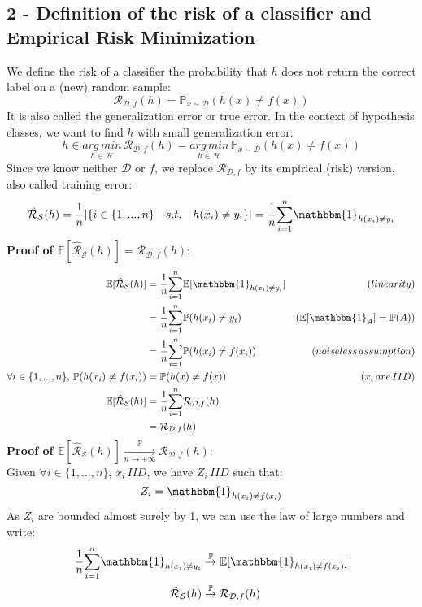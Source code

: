 \documentclass{homework}
\begin{document}
\subsection*{2 - Definition of the risk of a classifier and Empirical Risk Minimization}
We define the risk of a classifier the probability that $h$ does not return the correct label on a (new) random sample:
$$\mathcal{R}_{\mathcal{D},f}(h)=\mathbb{P}_{x\sim\mathcal{D}}(h(x)\neq f(x))$$
It is also called the generalization error or true error. In the context of hypothesis classes, we want to find $h$ with small generalization error:
$$h\in\underset{h\in\mathcal{H}}{arg\,min}\,\mathcal{R}_{\mathcal{D},f}(h)=\underset{h\in\mathcal{H}}{arg\,min}\,\mathbb{P}_{x\sim\mathcal{D}}(h(x)\neq f(x))$$
Since we know neither $\mathcal{D}$ or $f$, we replace $\mathcal{R}_{\mathcal{D},f}$ by its empirical (risk) version, also called training error:
$$\hat{\mathcal{R}}_{\mathcal{S}}(h)=\frac{1}{n}|\{i\in\{1,...,n\}\quad{s.t.}\quad h(x_i)\neq y_i\}|=\frac{1}{n}\underset{i=1}{\overset{n}{\sum}}\mathbbm{1}_{h(x_i)\neq y_i}$$
\textbf{Proof of $\mathbb{E}[\hat{\mathcal{R}}_{\mathcal{S}}(h)]=\mathcal{R}_{\mathcal{D},f}(h)$}:
\begin{align*}
   \mathbb{E}[\hat{\mathcal{R}}_{\mathcal{S}}(h)]&=\frac{1}{n}\underset{i=1}{\overset{n}{\sum}}\mathbb{E}[\mathbbm{1}_{h(x_i)\neq y_i}] &(linearity)\\
   &=\frac{1}{n}\underset{i=1}{\overset{n}{\sum}}\mathbb{P}(h(x_i)\neq y_i)&(\mathbb{E}[\mathbbm{1}_A]=\mathbb{P}(A))\\
   &=\frac{1}{n}\underset{i=1}{\overset{n}{\sum}}\mathbb{P}(h(x_i)\neq f(x_i))&(noiseless\, assumption)\\
   \forall i \in \{1,...,n\},\,\mathbb{P}(h(x_i)\neq f(x_i))&=\mathbb{P}(h(x)\neq f(x))&(x_i\,are\,IID)\\
   \mathbb{E}[\hat{\mathcal{R}}_{\mathcal{S}}(h)]&=\frac{1}{n}\underset{i=1}{\overset{n}{\sum}}\mathcal{R}_{\mathcal{D},f}(h)\\
   &=\mathcal{R}_{\mathcal{D},f}(h)
\end{align*}
\textbf{Proof of $\mathbb{E}[\hat{\mathcal{R}}_{\mathcal{S}}(h)]\underset{n\rightarrow+\infty}{\overset{\mathbb{P}}{\rightarrow}}\mathcal{R}_{\mathcal{D},f}(h)$}:\\
Given $\forall i\in\{1,...,n\},\,x_i\,{IID}$, we have $Z_i\,{IID}$ such that:
$$Z_i=\mathbbm{1}_{h(x_i)\neq f(x_i)}$$
As $Z_i$ are bounded almost surely by 1, we can use the law of large numbers and write:
\begin{align*}
\frac{1}{n}\underset{i=1}{\overset{n}{\sum}}\mathbbm{1}_{h(x_i)\neq y_i}&\overset{\mathbb{P}}{\rightarrow}\mathbb{E}[\mathbbm{1}_{h(x_i)\neq f(x_i)}]\\
\hat{\mathcal{R}}_{\mathcal{S}}(h)&\overset{\mathbb{P}}{\rightarrow}\mathcal{R}_{\mathcal{D}, f}(h)
\end{align*}
\end{document}
